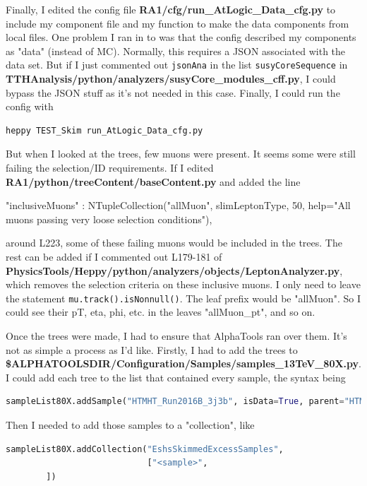 Finally, I edited the config file \textbf{RA1/cfg/run\_AtLogic\_Data\_cfg.py} to include my component file and my function to make the data components from local files. One problem I ran in to was that the config described my components as "data" (instead of MC). Normally, this requires a JSON associated with the data set. But if I just commented out \texttt{jsonAna} in the list \texttt{susyCoreSequence} in \textbf{TTHAnalysis/python/analyzers/susyCore\_modules\_cff.py}, I could bypass the JSON stuff as it's not needed in this case. Finally, I could run the config with

\begin{lstlisting}[belowskip=-0.7cm, language=sh, numbers=none]
heppy TEST_Skim run_AtLogic_Data_cfg.py
\end{lstlisting}

But when I looked at the trees, few muons were present. It seems some were still failing the selection/ID requirements. If I edited \textbf{RA1/python/treeContent/baseContent.py} and added the line

"inclusiveMuons" : NTupleCollection("allMuon", slimLeptonType, 50, help="All muons passing very loose selection conditions"),

around L223, some of these failing muons would be included in the trees. The rest can be added if I commented out L179-181 of \textbf{PhysicsTools/Heppy/python/analyzers/objects/LeptonAnalyzer.py}, which removes the selection criteria on these inclusive muons. I only need to leave the statement \texttt{mu.track().isNonnull()}. The leaf prefix would be "allMuon". So I could see their pT, eta, phi, etc. in the leaves "allMuon\_pt", and so on.

Once the trees were made, I had to ensure that AlphaTools ran over them. It's not as simple a process as I'd like. Firstly, I had to add the trees to \textbf{\$ALPHATOOLSDIR/Configuration/Samples/samples\_13TeV\_80X.py}. I could add each tree to the list that contained every sample, the syntax being

\begin{lstlisting}[belowskip=-0.7cm, language=python, numbers=none]
sampleList80X.addSample("HTMHT_Run2016B_3j3b", isData=True, parent="HTMHT")
\end{lstlisting}

Then I needed to add those samples to a "collection", like

\begin{lstlisting}[belowskip=-0.7cm, language=python, numbers=none]
sampleList80X.addCollection("EshsSkimmedExcessSamples",
                            ["<sample>",
        ])
\end{lstlisting}

